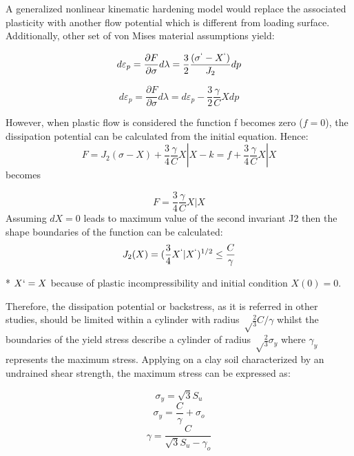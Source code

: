 \documentclass[12pt,a4paper]{report}
\begin{document}
A generalized nonlinear kinematic hardening model would replace the associated plasticity with another flow potential which is different from loading surface. Additionally, other set of von Mises material assumptions yield:

\begin{equation}
	d\varepsilon_p=\frac{\partial F}{\partial \sigma} d\lambda = \frac{3}{2} \frac{(\sigma^` - X^`)}{J_2} dp
\end{equation}

\begin{equation}
d\varepsilon_p=\frac{\partial F}{\partial \sigma} d\lambda = d\varepsilon_p - \frac{3}{2} \frac{\gamma}{C}X dp
\end{equation}

However, when plastic flow is considered the function f becomes zero ($f=0$), the dissipation potential can be calculated from the initial equation. Hence:
\begin{equation}
	F=J_2(\sigma - X)+ \frac{3}{4} \frac{\gamma}{C} X|X -k = f+\frac{3}{4} \frac{\gamma}{C}X|X
\end{equation}
becomes

\begin{equation}
	F=\frac{3}{4} \frac{\gamma}{C}X|X
\end{equation}
Assuming $dX=0$ leads to maximum value of the second invariant J2 then the shape boundaries of the function can be calculated:
\begin{equation}
	J_2(X)=(\frac{3}{4}X^`|X^`)^{1/2}\leq\frac{C}{\gamma}
\end{equation}

* $X`=X$ because of plastic incompressibility and initial condition $X(0)=0$.

Therefore, the dissipation potential or backstress, as it is referred in other studies, should be limited within a cylinder with radius $\sqrt\frac{2}{3} C/\gamma$ whilst the boundaries of the yield stress describe a cylinder of radius  $\sqrt\frac{2}{3}\sigma_y$ where $\gamma_y$ represents the maximum stress. Applying on a clay soil characterized by an undrained shear strength, the maximum stress can be expressed as:

\begin{equation}
\sigma_y=\sqrt{3}S_u
\end{equation}
\begin{equation}
\sigma_y = \frac{C}{\gamma}+\sigma_o
\end{equation}
\begin{equation}
\gamma = \frac{C}{\sqrt{3}S_u - \gamma_o}
\end{equation}
\end{document}

